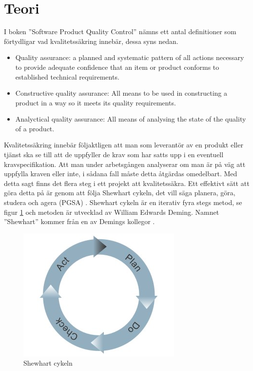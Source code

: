 \section{Teori}
I boken ''Software Product Quality Control'' \cite{SPQC} nämns ett antal definitioner som förtydligar vad kvalitetssäkring innebär, dessa syns nedan.  

\begin{itemize}
  \item Quality assurance: a planned and systematic pattern of all actions necessary to provide adequate confidence that an item or product conforms to established technical requirements. 
  \item Constructive quality assurance: All means to be used in constructing a product in a way so it meets its quality requirements. 
  \item Analyctical quality assurance: All means of analysing the state of the quality of a product. 
\end{itemize}
\noindent Kvalitetssäkring innebär följaktligen att man som leverantör av en produkt eller tjänst ska se till att de uppfyller de krav som har satts upp i en eventuell kravspecifikation. Att man under arbetsgången analyserar om man är på väg att uppfylla kraven eller inte, i sådana fall måste detta åtgärdas omedelbart.
\newline
\newline
Med detta sagt finns det flera steg i ett projekt att kvalitetssäkra. Ett effektivt sätt att göra detta på är genom att följa Shewhart cykeln, det vill säga planera, göra, studera och agera (PGSA) \cite{Wiki}. Shewhart cykeln är en iterativ fyra stegs metod, se figur \ref{fig:shewcycle} och metoden är utvecklad av William Edwards Deming. Namnet ''Shewhart'' kommer från en av Demings kollegor \cite[p.~88]{Deming}. 
\begin{figure}[h]
\centerline{\includegraphics[scale=0.5]{ruben-tex/graphic/shewhartcycle}}
\caption{Shewhart cykeln \cite{Mindtools}}
\label{fig:shewcycle}
\end{figure}
